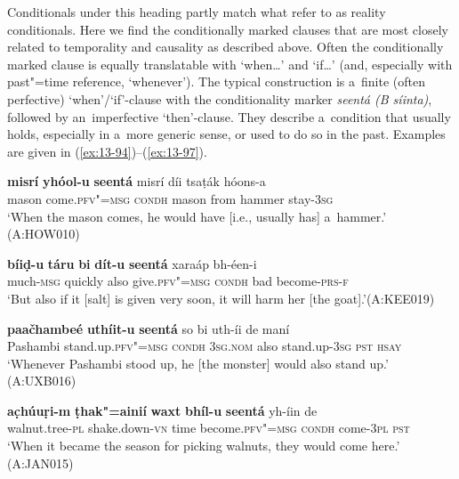  Conditionals under this heading partly match what \citet[255--256]{thompsonetal2007} refer to as reality conditionals. Here we find the conditionally marked clauses that are most closely related to temporality and causality as described above. Often the conditionally marked clause is equally translatable with `when{\ldots}' and `if{\ldots}' (and, especially with past"=time reference, `whenever'). The typical construction is a~finite (often perfective) `when'/`if'-clause with the conditionality marker \textit{seentá (B síinta)}, followed by an~imperfective `then'-clause. They describe a~condition that usually holds, especially in a~more generic sense, or used to do so in the past. Examples are given in (\ref{ex:13-94})--(\ref{ex:13-97}).

\begin{exe}
\ex
\label{ex:13-94}
\gll \textbf{misrí} \textbf{yhóol-u} \textbf{seentá} misrí díi tsaṭák hóons-a \\
mason come.\textsc{pfv"=msg} \textsc{condh} mason from hammer stay-\textsc{3sg}  \\
\glt `When the mason comes, he would have [i.e., usually has] a~hammer.' (A:HOW010)

\ex
\label{ex:13-95}
\gll \textbf{bíiḍ-u} \textbf{táru} \textbf{bi} \textbf{dít-u} \textbf{seentá} xaraáp  bh-éen-i \\
much-\textsc{msg} quickly also give.\textsc{pfv"=msg} \textsc{condh} bad  become-\textsc{prs-f}   \\
\glt `But also if it [salt] is given very soon, it will harm her [the goat].'\newline (A:KEE019)

\ex
\label{ex:13-96}
\gll \textbf{paačhambeé} \textbf{uthíit-u} \textbf{seentá} so bi  uth-íi de maní \\
Pashambi stand.up.\textsc{pfv"=msg} \textsc{condh} \textsc{3sg.nom} also stand.up-\textsc{3sg} \textsc{pst} \textsc{hsay}  \\
\glt `Whenever Pashambi stood up, he [the monster] would also stand up.' (A:UXB016)

\ex
\label{ex:13-97}
\gll \textbf{ac̣húuṛi-m} \textbf{ṭhak"=ainií} \textbf{waxt} \textbf{bhíl-u} \textbf{seentá}  yh-íin de \\
walnut.tree-\textsc{pl} shake.down-\textsc{vn} time become.\textsc{pfv"=msg} \textsc{condh} come-\textsc{3pl} \textsc{ pst}    \\
\glt `When it became the season for picking walnuts, they would come here.' (A:JAN015) 
\end{exe}


